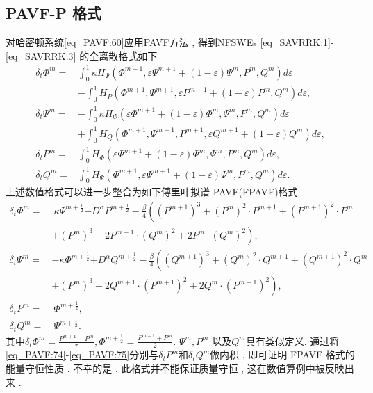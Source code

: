 \subsection{PAVF-P 格式}
对哈密顿系统\eqref{eq_PAVF:60}应用PAVF方法 , 得到NFSWEs \eqref{eq_SAVRRK:1}-\eqref{eq_SAVRRK:3} 的全离散格式如下
\begin{align}
\delta_{t} \varPhi^{m}=&\int_{0}^{1}\kappa H_{\Psi}\left(\varPhi^{m+1} , \varepsilon \Psi^{m+1}+(1-\varepsilon) \Psi^{m} , P^{m} , Q^{m}\right)d \varepsilon\nonumber\\
&-\int_{0}^{1}H_{P}\left(\varPhi^{m+1} , \Psi^{m+1} , \varepsilon P^{m+1}+(1-\varepsilon) P^{m} , Q^{m}\right)d \varepsilon , \label{eq_PAVF:70}\\
\delta_{t} \Psi^{m}=&-\int_{0}^{1}\kappa H_{\varPhi}\left(\varepsilon \varPhi^{m+1}+(1-\varepsilon) \varPhi^{m} , \Psi^{m} , P^{m} , Q^{m}\right)d \varepsilon\nonumber\\
&+\int_{0}^{1}H_{Q}\left(\varPhi^{m+1} , \Psi^{m+1} , P^{m+1} , \varepsilon Q^{m+1}+(1-\varepsilon) Q^{m}\right)d\varepsilon , \label{eq_PAVF:71}\\
\delta_{t} P^{m}=&\int_{0}^{1}H_{\varPhi}\left(\varepsilon \varPhi^{m+1}+(1-\varepsilon) \varPhi^{m} , \Psi^{m} , P^{m} , Q^{m}\right) d \varepsilon , \label{eq_PAVF:72}\\
\delta_{t} Q^{m}=&\int_{0}^{1}H_{\Psi}\left(\varPhi^{m+1} , \varepsilon \Psi^{m+1}+(1-\varepsilon) \Psi^{m} , P^{m} , Q^{m}\right) d \varepsilon . \label{eq_PAVF:73}
\end{align}
上述数值格式可以进一步整合为如下傅里叶拟谱 PAVF(FPAVF)格式
\begin{align}
\delta_{t} \varPhi^{m}=&~\kappa \Psi^{m+\frac{1}{2}}{+D^{\alpha} P^{m+\frac{1}{2}}}-\frac{\beta}{4}\left( (P^{m+1})^3+ (P^{m})^{2}\cdot P^{m+1}+(P^{m+1})^{2}\cdot P^{m}\right . \nonumber\\
	&+\left . (P^{m})^{3}+2 P^{m+1}\cdot (Q^{m})^{2}+2 P^{m}\cdot (Q^{m})^{2}\right) , \label{eq_PAVF:74}\\
\delta_{t} \Psi^{m}=&-\kappa \varPhi^{m+\frac{1}{2}}{+D^{\alpha} Q^{m+\frac{1}{2}}}-\frac{\beta}{4}\left( (Q^{m+1})^3+ (Q^{m})^{2}\cdot Q^{m+1}+(Q^{m+1})^{2}\cdot Q^{m}\right . \nonumber\\
	&+\left . (P^{m})^{3}+2 Q^{m+1}\cdot (P^{m+1})^{2}+2 Q^{m}\cdot (P^{m+1})^{2}\right) , \label{eq_PAVF:75}\\
\delta_{t} P^{m}=&~\varPhi^{m+\frac{1}{2}} , \label{eq_PAVF:76}\\
\delta_{t} Q^{m}=&~\Psi^{m+\frac{1}{2}} . \label{eq_PAVF:77}
\end{align}
其中$\delta_{t} \varPhi^{m} = \frac{P^{m+1}-P^{m}}{\tau}, \varPhi^{m+\frac{1}{2}} = \frac{P^{m+1}+P^{m}}{2}$. $\Psi^{m}, P^{m}$ 以及$Q^{m}$具有类似定义.
通过将\eqref{eq_PAVF:74}-\eqref{eq_PAVF:75}分别与$\delta_t P^{m}$和$\delta_t Q^{m}$做内积 , 即可证明 FPAVF 格式的能量守恒性质 . 
不幸的是 , 此格式并不能保证质量守恒 , 这在数值算例中被反映出来 . 

